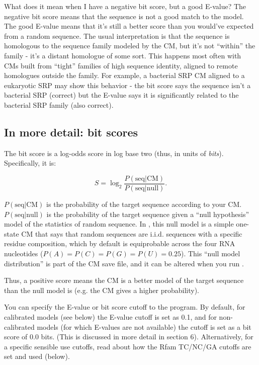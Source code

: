 \begin{srefaq}{What does it mean when I have a negative bit score,
    but a good E-value?} The negative bit score means that the sequence is
  not a good match to the model. The good E-value means that it's still
  a better score than you would've expected from a random sequence. The
  usual interpretation is that the sequence is homologous to the
  sequence family modeled by the CM, but it's not ``within'' the family
  - it's a distant homologue of some sort. This happens most often with
  CMs built from ``tight'' families of high sequence identity, aligned
  to remote homologues outside the family. For example, a bacterial SRP
  CM aligned to a eukaryotic SRP may show this behavior - the bit
  score says the sequence isn't a bacterial SRP (correct) but the E-value says
  it is significantly related to the bacterial SRP family (also correct).
\end{srefaq}

\subsection{In more detail:  bit scores}

The bit score is a log-odds score in log base two (thus, in units of
{\em bits}). Specifically, it is:

\[
S = \log_2 \frac {P( \mbox{seq} | \mbox{CM})} { P (\mbox{seq} |
  \mbox{null})}.
\]

$P( \mbox{seq} | \mbox{CM})$ is the probability of the target
sequence according to your CM. $ P (\mbox{seq} | \mbox{null}) $ is
the probability of the target sequence given a ``null hypothesis''
model of the statistics of random sequence. In , this null model
is a simple one-state CM that says that random sequences are i.i.d.
sequences with a specific residue composition, which by default is
equiprobable across the four RNA nucleotides ($P(A) = P(C) = P(G) =
P(U) = 0.25$). This ``null model distribution'' is part of the CM save
file, and it can be altered when you run .

Thus, a positive score means the CM is a better model of the target
sequence than the null model is (e.g. the CM gives a higher
probability).

You can specify the E-value or bit score cutoff to the 
program. By default, for calibrated models (see below) the E-value
cutoff is set as 0.1, and for non-calibrated models (for which
E-values are not available) the cutoff is set as a bit score of 0.0
bits. (This is discussed in more detail in section 6). Alternatively,
for a specific sensible use cutoffs, read about how the Rfam
TC/NC/GA cutoffs are set and used (below).

